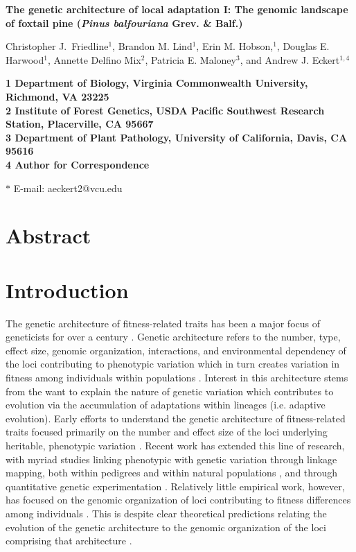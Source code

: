 \documentclass[11pt]{article}
\begin{document}
\begin{flushleft} 
\singlespacing
{\Large \textbf{The genetic architecture of local adaptation I: The genomic landscape of 
foxtail pine (\textit{Pinus balfouriana} Grev. \& Balf.)}}
\null

Christopher J.\ Friedline$^{1}$, 
Brandon M. Lind$^{1}$,
Erin M. Hobson,$^{1}$,
Douglas E. Harwood$^{1}$, 
Annette Delfino Mix$^{2}$,
Patricia E. Maloney$^{3}$, and
Andrew J. Eckert$^{1,4}$
\null

\bf{1} Department of Biology, Virginia Commonwealth University, Richmond, VA 23225
\\
\bf{2} Institute of Forest Genetics, USDA Pacific Southwest Research Station, Placerville, 
CA 95667
\\
\bf{3} Department of Plant Pathology, University of California, Davis, CA 95616
\\
\bf{4} Author for Correspondence
\null

$\ast$ E-mail: aeckert2@vcu.edu
\end{flushleft}

\section*{Abstract}

\section*{Introduction}
The genetic architecture of fitness-related traits has been a major focus of geneticists for 
over a century \citep[reviewed by][]{Ellegren:2008}. Genetic architecture refers to the number, type, effect size, genomic organization, 
interactions, and environmental dependency of the loci contributing to phenotypic variation 
which in turn creates variation in fitness among individuals within populations \citep[cf.][]{Eckert:2012a}. 
Interest in this architecture stems from the want to explain the nature of genetic variation which 
contributes to evolution via the accumulation of adaptations within lineages (i.e. adaptive evolution).
Early efforts to understand the genetic architecture of fitness-related traits
focused primarily on the number and effect size of the loci underlying heritable, phenotypic variation \citep{Fisher:1930}. Recent work has extended this line of research, with myriad studies linking phenotypic with genetic variation 
through linkage mapping, both within pedigrees \citep{Mauricio:2001, Neale:2011, Ritland:2011} and within 
natural populations \citep{Ingvarsson:2011, Eckert:2013a}, 
and through quantitative genetic experimentation \citep{Anderson:2013a, Anderson:2013b, Fournier-Level:2013}. Relatively 
little empirical work, however, has focused on the genomic organization of loci contributing to fitness differences 
among individuals \citep[but see][]{Stevison:2011}. This is despite clear theoretical predictions relating the evolution of the genetic architecture to the 
genomic organization of the loci comprising that architecture \citep{Kirkpatrick:2006, Yeaman:2011, Yeaman:2013}.
\end{document}
